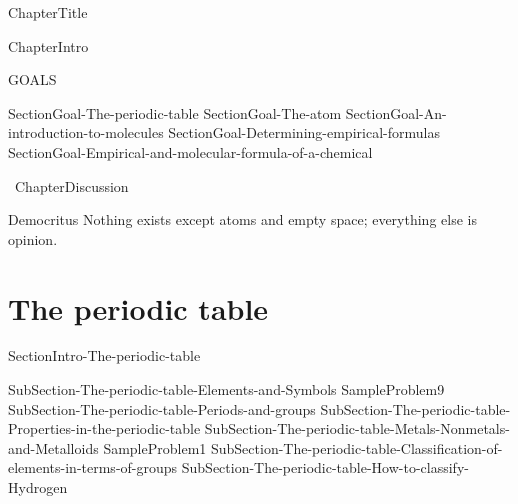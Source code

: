 \documentclass[main.tex]{subfiles}
\newcommand\chapterlabel{Ch-Table}\setcounter{figurenewcounter}{0}\setcounter{tablenewcounter}{0}\setcounter{formulanewcounter}{0}
\begin{document}
\linenumbers
 {ChapterTitle}
 
 
 
\begin{marginfigure}
      \texttt{[image: ../\{\\chapterlabel]}/figure1}
   \end{marginfigure}
   
 {ChapterIntro}
\begin{marginfigure}%
\begin{mytcbox}{GOALS}
\begin{enumerate}[label=\protect\circled{\color{white}\arabic*}]
  {SectionGoal-The-periodic-table}
 {SectionGoal-The-atom}
  {SectionGoal-An-introduction-to-molecules}
 {SectionGoal-Determining-empirical-formulas}
 {SectionGoal-Empirical-and-molecular-formula-of-a-chemical}
\end{enumerate}
\end{mytcbox}
\vspace{1cm}
\begin{tcolorbox}[enhanced,colback=red!5!white,colframe=black!50!red,boxrule=1pt,
  arc=0pt,outer arc=0pt,drop heavy lifted shadow]
\faGears\ 
 {ChapterDiscussion}
 \end{tcolorbox}
\vspace{1cm}    
\begin{shadequote}[l]{Democritus}
Nothing exists except atoms and empty space; everything else is opinion.
\end{shadequote}   
\end{marginfigure}%

\section{The periodic table}{SectionIntro-The-periodic-table}
\sloppy\begin{description}
{SubSection-The-periodic-table-Elements-and-Symbols}
{SampleProblem9}
{SubSection-The-periodic-table-Periods-and-groups}
{SubSection-The-periodic-table-Properties-in-the-periodic-table}
{SubSection-The-periodic-table-Metals-Nonmetals-and-Metalloids}
{SampleProblem1}
{SubSection-The-periodic-table-Classification-of-elements-in-terms-of-groups}
{SubSection-The-periodic-table-How-to-classify-Hydrogen}
 \hspace{0cm}{Figure-The-periodic-table}
 \end{description}
 
\end{document}
